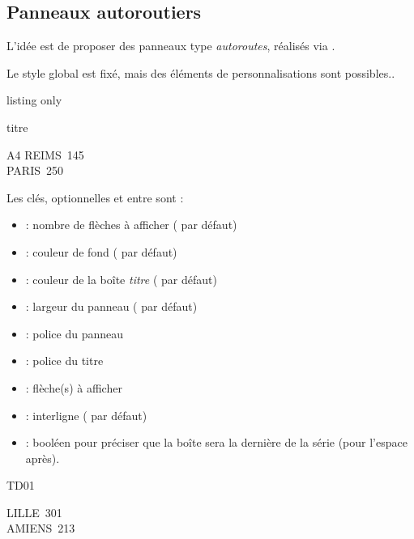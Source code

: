 \documentclass[french,11pt,a4paper]{article}
\begin{document}
\pagebreak

\subsection{Panneaux autoroutiers}

L'idée est de proposer des panneaux type \textit{autoroutes}, réalisés via .

Le style global est fixé, mais des éléments de personnalisations sont possibles..

\begin{DemoCode}{listing only}
\begin{PanneauAutoroute}[clés]{titre}
\end{PanneauAutoroute}
\end{DemoCode}

\begin{DemoCode}{}
\begin{PanneauAutoroute}{A4}
REIMS\hfill~145\\
PARIS\hfill~250
\end{PanneauAutoroute}
\end{DemoCode}

Les clés, optionnelles et entre \MontreCode{[...]} sont :

\begin{itemize}
	\item {} : nombre de flèches à afficher ( par défaut)
	\item {} : couleur de fond ( par défaut)
	\item {} : couleur de la boîte \textit{titre} ( par défaut)
	\item {} : largeur du panneau (\MontreCode{10cm} par défaut)
	\item {} : police du panneau
	\item {} : police du titre
	\item {} : flèche(s) à afficher
	\item {} : interligne (\MontreCode{2.5mm} par défaut)
	\item {} : booléen pour préciser que la boîte sera la dernière de la série (pour l'espace après).
\end{itemize}

\begin{DemoCode}{}
\begin{PanneauAutoroute}[Largeur=\linewidth,Dernier=false]{TD01}
\end{PanneauAutoroute}

\begin{PanneauAutoroute}%
	[CouleurFond=olive,Fleches=2,Police=\bfseries\huge\fontfamily{phv}\selectfont]{}
	LILLE\hfill~301\\
	AMIENS\hfill~213
\end{PanneauAutoroute}
\end{DemoCode}
\end{document}
